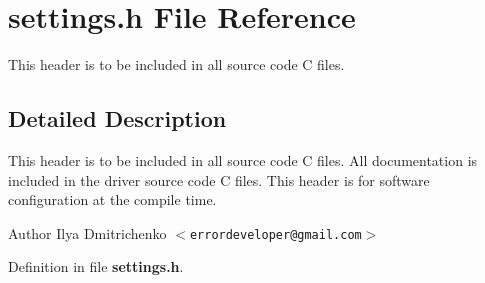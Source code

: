 \section{settings.h File Reference}
\label{settings_8h}


This header is to be included in all source code C files.  




\subsection{Detailed Description}
This header is to be included in all source code C files. All documentation is included in the driver source code C files. This header is for software configuration at the compile time.

\begin{DoxyAuthor}{Author}
Ilya Dmitrichenko $<${\tt errordeveloper@gmail.com}$>$ 
\end{DoxyAuthor}


Definition in file {\bf settings.h}.

